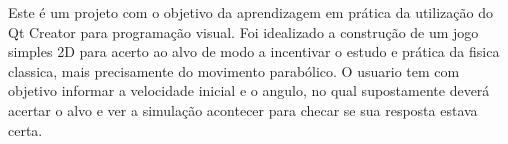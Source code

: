 Este é um projeto com o objetivo da aprendizagem em prática da utilização do Qt Creator para programação visual. Foi idealizado a construção de um jogo simples 2\+D para acerto ao alvo de modo a incentivar o estudo e prática da fisica classica, mais precisamente do movimento parabólico. O usuario tem com objetivo informar a velocidade inicial e o angulo, no qual supostamente deverá acertar o alvo e ver a simulação acontecer para checar se sua resposta estava certa. 